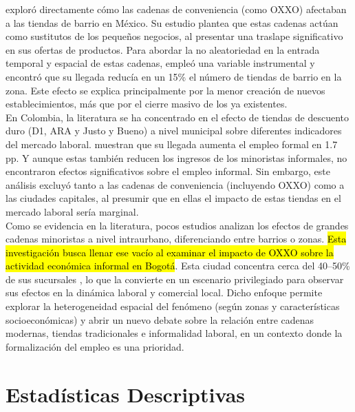 \documentclass{article}
\begin{document}
\textcite{marcos2022} exploró directamente cómo las cadenas de conveniencia (como OXXO) afectaban a las tiendas de barrio en México. Su estudio plantea que estas cadenas actúan como sustitutos de los pequeños negocios, al presentar una traslape significativo en sus ofertas de productos. Para abordar la no aleatoriedad en la entrada temporal y espacial de estas cadenas, empleó una variable instrumental y encontró que su llegada reducía en un 15\% el número de tiendas de barrio en la zona. Este efecto se explica principalmente por la menor creación de nuevos establecimientos, más que por el cierre masivo de los ya existentes. \\

En Colombia, la literatura se ha concentrado en el efecto de tiendas de descuento duro (D1, ARA y Justo y Bueno) a nivel municipal sobre diferentes indicadores del mercado laboral. \textcite{delgado2024} muestran que su llegada aumenta el empleo formal en 1.7 pp. Y aunque estas también reducen los ingresos de los minoristas informales, no encontraron efectos significativos sobre el empleo informal. Sin embargo, este análisis excluyó tanto a las cadenas de conveniencia (incluyendo OXXO) como a las ciudades capitales, al presumir que en ellas el impacto de estas tiendas en el mercado laboral sería marginal. \\

Como se evidencia en la literatura, pocos estudios analizan los efectos de grandes cadenas minoristas a nivel intraurbano, diferenciando entre barrios o zonas. \hl{Esta investigación busca llenar ese vacío al examinar el impacto de OXXO sobre la actividad económica informal en Bogotá}. Esta ciudad concentra cerca del 40–50\% de sus sucursales \parencite{godoy2025}, lo que la convierte en un escenario privilegiado para observar sus efectos en la dinámica laboral y comercial local. Dicho enfoque permite explorar la heterogeneidad espacial del fenómeno (según zonas y características socioeconómicas) y abrir un nuevo debate sobre la relación entre cadenas modernas, tiendas tradicionales e informalidad laboral, en un contexto donde la formalización del empleo es una prioridad.\\

\section{Estadísticas Descriptivas} 
\end{document}
